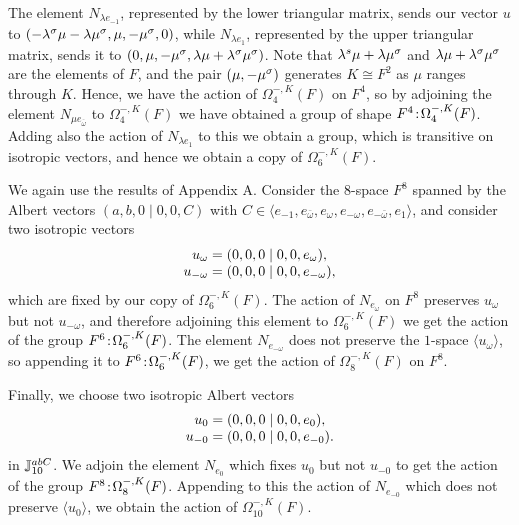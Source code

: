 The element $N_{\lambda e_{-1}}$, represented by the lower triangular matrix, sends our vector
$u$
to $(-\lambda^{\sigma} \mu - \lambda\mu^{\sigma}, \mu, -\mu^{\sigma}, 0)$, while 
$N_{\lambda e_1}$, represented by the upper triangular matrix, sends it to
$(0,\mu, -\mu^{\sigma}, \lambda\mu + \lambda^{\sigma}\mu^{\sigma})$. Note that
$\lambda^{s}\mu + \lambda\mu^{\sigma}$ and $\lambda\mu + \lambda^{\sigma}\mu^{\sigma}$ are
the elements of $F$, and the pair $(\mu, -\mu^{\sigma})$ generates $K \cong F^{2}$ as
$\mu$ ranges through $K$. Hence, we have the action of $\Omega_4^{-,K}(F)$ on
$F^4$, so by adjoining the element $N_{\mu e_{\bar{\omega}}}$ to $\Omega_4^{-,K}(F)$
we have obtained a group of shape $F^{4}\mathord{{\;\!{:}\;\!}}\Omega_4^{-,K}(F)$. Adding also the action
of $N_{\lambda e_1}$ to this we obtain a group, which is transitive on isotropic vectors, and hence
we obtain a copy of $\Omega_6^{-,K}(F)$. 

We again use the results of Appendix A. Consider the $8$-space $F^8$ spanned by the Albert vectors $(a,b,0\mid 0,0,C)$ with 
$C \in \langle e_{-1}, e_{\bar{\omega}}, e_{\omega}, 
e_{- \omega}, e_{-\bar{\omega}}, e_1 \rangle$, and consider two isotropic vectors
\begin{equation}
	\begin{array}{r@{\;}c@{\;}l}
		u_{\omega} & = & (0,0,0 \mid 0,0,e_{\omega}), \\
		u_{-\omega} & = & (0,0,0 \mid 0,0,e_{-\omega}),
	\end{array}
\end{equation}
which are fixed by our copy of $\Omega_6^{-,K}(F)$. The action of $N_{e_{\omega}}$ on $F^8$
preserves $u_{\omega}$ but not $u_{-\omega}$, and therefore adjoining this element to 
$\Omega_6^{-,K}(F)$ we get the action of the group $F^6\mathord{{\;\!{:}\;\!}}\Omega_6^{-,K}(F)$. The element
$N_{e_{-\omega}}$ does not preserve the $1$-space $\langle u_{\omega} \rangle$, so appending it to 
$F^6\mathord{{\;\!{:}\;\!}}\Omega_6^{-,K}(F)$, we get the action of $\Omega_8^{-,K}(F)$ on $F^8$. 

Finally, we choose two isotropic Albert vectors
\begin{equation}
	\begin{array}{r@{\;}c@{\;}l}
		u_0 & = & (0,0,0\mid 0,0,e_0), \\
		u_{-0} & = & (0,0,0\mid 0,0,e_{-0}).
	\end{array}
\end{equation}
in $\mathbb{J}_{10}^{abC}$. We adjoin the element $N_{e_{0}}$ which fixes $u_0$ but not $u_{-0}$ to 
get the action of the group $F^8\mathord{{\;\!{:}\;\!}} \Omega_8^{-,K}(F)$. Appending to this the action of
$N_{e_{-0}}$ which does not preserve $\langle u_0 \rangle$, we obtain the action of
$\Omega_{10}^{-,K}(F)$.

